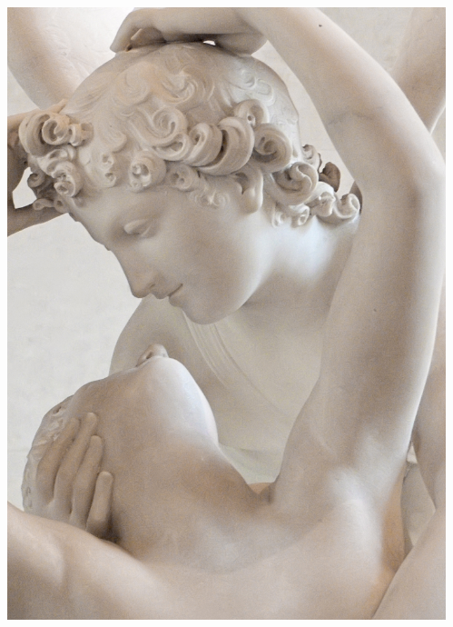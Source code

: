 \documentclass{beamer}
\begin{document}
\begin{frame}
\begin{columns}[t]
\begin{column}{0.45\textwidth}
		\includegraphics[width=0.5\paperwidth]{marble}
    \end{column}
​  \end{columns}
\end{frame}
\end{document}
